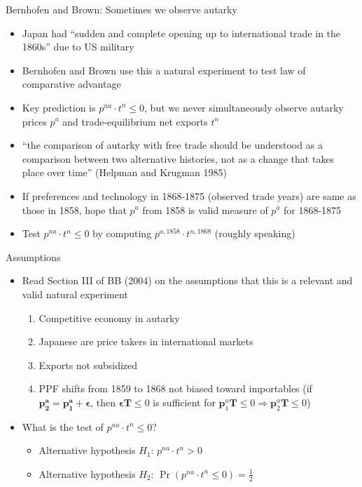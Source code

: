 \documentclass[11pt,notes=hide,aspectratio=169]{beamer}
\begin{document}
\begin{frame}{Bernhofen and Brown: Sometimes we observe autarky}
\begin{itemize}
	\item Japan had ``sudden and complete opening up to international trade in the 1860s'' due to US military
	\item Bernhofen and Brown use this a natural experiment to test law of comparative advantage
	\item Key prediction is $p^{na} \cdot t^n \leq 0$, but we never simultaneously observe autarky prices $p^a$ and trade-equilibrium net exports $t^n$
	\item ``the comparison of autarky with free trade should be understood as a comparison between two alternative histories, not as a change that takes place over time'' (Helpman and Krugman 1985)
	\item If preferences and technology in 1868-1875 (observed trade years) are same as those in 1858, hope that $p^a$ from 1858 is valid measure of $p^a$ for 1868-1875
	\item Test $p^{na} \cdot t^n \leq 0$ by computing $p^{a,1858} \cdot t^{n,1868}$ (roughly speaking)
\end{itemize}
\end{frame}
\begin{frame}{Assumptions}
\begin{itemize}
	\item Read Section III of BB (2004) on the assumptions that this is a relevant and valid natural experiment
	\begin{enumerate}
		\item Competitive economy in autarky
		\item Japanese are price takers in international markets
		\item Exports not subsidized
		\item PPF shifts from 1859 to 1868 not biased toward importables (if $\mathbf{p_2^a} = \mathbf{p_1^a} + \mathbf{\epsilon}$, then $\mathbf{\epsilon} \mathbf{T} \leq 0$ is sufficient for $\mathbf{p}_1^a \mathbf{T}\leq 0 \Rightarrow \mathbf{p}_2^a \mathbf{T}\leq 0$)
	\end{enumerate}
	\item What is the test of $p^{na} \cdot t^n \leq 0$?
	\begin{itemize}
		\item Alternative hypothesis $H_1$: $p^{na} \cdot t^n > 0$
		\item Alternative hypothesis $H_2$: $\Pr\left(p^{na} \cdot t^n \leq 0\right)=\frac{1}{2}$
	\end{itemize}
\end{itemize}
\end{frame}
\end{document}
